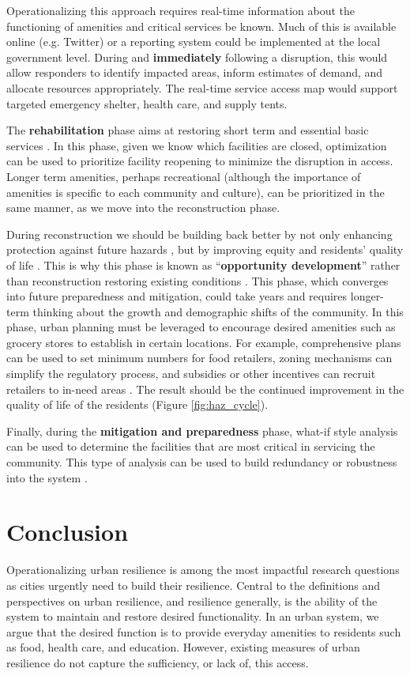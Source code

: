 \documentclass[9pt,twocolumn,twoside,lineno]{pnas-new}
\begin{document}
Operationalizing this approach requires real-time information about the functioning of amenities and critical services be known. Much of this is available online (e.g. Twitter) or a reporting system could be implemented at the local government level. During and \textbf{immediately} following a disruption, this would allow responders to identify impacted areas, inform estimates of demand, and allocate resources appropriately. The real-time service access map would support targeted emergency shelter, health care, and supply tents. 

The \textbf{rehabilitation} phase aims at restoring short term and essential basic services \cite{Resendiz-Vazquez2019-ol}. In this phase, given we know which facilities are closed, optimization can be used to prioritize facility reopening to minimize the disruption in access. Longer term amenities, perhaps recreational (although the importance of amenities is specific to each community and culture), can be prioritized in the same manner, as we move into the reconstruction phase.

During reconstruction we should be building back better \cite{Resendiz-Vazquez2019-ol} by not only enhancing protection against future hazards \cite{Platt2019-lx}, but by improving equity and residents’ quality of life \cite{Pantelic1991-qu}. 
This is why this phase is known as “\textbf{opportunity development}” rather than reconstruction restoring existing conditions \cite{Resendiz-Vazquez2019-ol,Pantelic1991-qu}. 
This phase, which converges into future preparedness and mitigation, could take years and requires longer-term thinking about the growth and demographic shifts of the community. 
In this phase, urban planning must be leveraged to encourage desired amenities such as grocery stores to establish in certain locations. 
For example, comprehensive plans can be used to set minimum numbers for food retailers, zoning mechanisms can simplify the regulatory process, and subsidies or other incentives can recruit retailers to in-need areas \cite{Raja2010-cm, Raja2008-wx}. 
The result should be the continued improvement in the quality of life of the residents (Figure \ref{fig:haz_cycle}). 

Finally, during the \textbf{mitigation and preparedness} phase, what-if style analysis can be used to determine the facilities that are most critical in servicing the community. 
This type of analysis can be used to build redundancy or robustness into the system \cite{Wardekker2010-hw}.

\section*{Conclusion}
Operationalizing urban resilience is among the most impactful research questions \cite{Caldarice2019-tv} as cities urgently need to build their resilience. Central to the definitions and perspectives on urban resilience, and resilience generally, is the ability of the system to maintain and restore desired functionality. In an urban system, we argue that the desired function is to provide everyday amenities to residents such as food, health care, and education. However, existing measures of urban resilience do not capture the sufficiency, or lack of, this access. 
\end{document}
